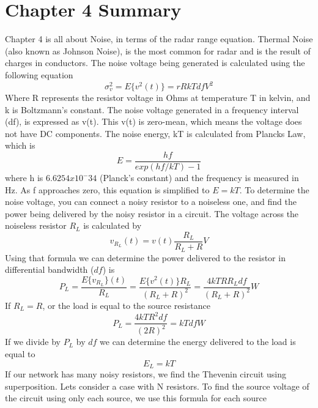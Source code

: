 \documentclass[12pt]{article}
\begin{document}
\section{Chapter 4 Summary}
Chapter 4 is all about Noise, in terms of the radar range equation. Thermal Noise (also known as Johnson Noise), is the most common for radar and is the result of charges in conductors. The noise voltage being generated is calculated using the following equation 
\begin{equation}
    \sigma_v^2 = E \{ v^2 (t) \} = r R k T df V^2
\end{equation}
Where R represents the resistor voltage in Ohms at temperature T in kelvin, and k is Boltzmann's constant. The noise voltage generated in a frequency interval (df), is expressed as v(t). This v(t) is zero-mean, which means the voltage does not have DC components. The noise energy, kT is calculated from Plancks Law, which is 
\begin{equation}
    E = \frac{hf}{ exp(hf/ kT) - 1}
\end{equation} 
where h is $6.6254x10^-34$ (Planck's constant) and the frequency is measured in Hz. As f approaches zero, this equation is simplified to $E =kT$. To determine the noise voltage, you can connect a noisy resistor to a noiseless one, and find the power being delivered by the noisy resistor in a circuit. The voltage across the noiseless resistor $R_L$ is calculated by
\begin{equation}
    v_{R_L} (t) = v (t) \frac{R_L}{R_L + R} V
\end{equation} 
Using that formula we can determine the power delivered to the resistor in differential bandwidth ($df$) is
\begin{equation}
    P_L = \frac{ E \{v_{R_L} \}(t)}{R_L} = \frac{E \{ v^2 (t)\} R_L}{(R_L + R)^2} = \frac{4kTRR_L df}{(R_L + R)^2} W
\end{equation}
If $R_L = R$, or the load is equal to the source resistance
\begin{equation}
    P_L = \frac{4kTR^2 df}{(2R)^2} = kTdf W
\end{equation}
If we divide by $P_L$ by $df$ we can determine the energy delivered to the load is equal to 
\begin{equation}
    E_L = kT
\end{equation}
If our network has many noisy resistors, we find the Thevenin circuit using superposition. Lets consider a case with N resistors. To find the source voltage of the circuit using only each source, we use this formula for each source
\end{document}
